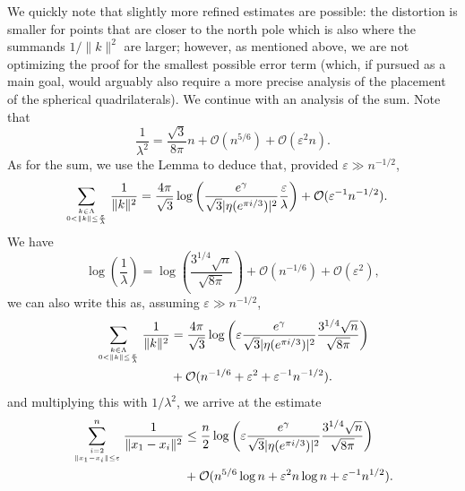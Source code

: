 \documentclass[10pt, reqno]{amsart}
\begin{document}
    We quickly note that slightly more refined estimates are possible: the distortion is smaller for points that are closer to the north pole which is also where the summands $1/\|k\|^2$ are larger; however, as mentioned above, we are not optimizing the proof for the smallest possible error term (which, if pursued as a main goal, would arguably also require a more precise analysis of the placement of the spherical quadrilaterals). We continue with an analysis of the sum. Note that
  $$ \frac{1}{\lambda^2} = \frac{\sqrt{3}}{8\pi} n + \mathcal{O}(n^{5/6}) + \mathcal{O}( \varepsilon^2 n ).$$
  As for the sum, we use the Lemma to deduce that, provided $\varepsilon \gg n^{-1/2}$,
  \begin{align*}
   \sum_{k \in \Lambda \atop 0 < \|  k\| \leq \frac{\varepsilon}{\lambda}} \frac{1}{\| k\|^2} &=  \frac{4\pi}{\sqrt{3}} \log\left( \frac{e^{\gamma}}{\sqrt{3} |\eta(e^{\pi i/3})|^2} \frac{\varepsilon}{\lambda} \right) + \mathcal{O}(\varepsilon^{-1} n^{-1/2}).
  \end{align*}
We have
  $$ \log \left( \frac{1}{\lambda}\right) =  \log \left( \frac{ 3^{1/4} \sqrt{n}}{ \sqrt{8 \pi}}\right) + \mathcal{O}(n^{-1/6}) + \mathcal{O}(\varepsilon^2),$$
  we can also write this as, assuming $\varepsilon \gg n^{-1/2}$,
    \begin{align*}
   \sum_{k \in \Lambda \atop 0 < \|  k\| \leq \frac{\varepsilon}{\lambda}} \frac{1}{\| k\|^2} &=  \frac{4\pi}{\sqrt{3}} \log\left(\varepsilon \frac{e^{\gamma}}{\sqrt{3} |\eta(e^{\pi i/3})|^2}  \frac{ 3^{1/4} \sqrt{n}}{ \sqrt{8 \pi}}\right) \\
   &+ \mathcal{O}(n^{-1/6} + \varepsilon^2 + \varepsilon^{-1} n^{-1/2}).
  \end{align*} 
  and multiplying this with $1/\lambda^2$, we arrive at the estimate
  \begin{align*}
  \sum_{i=2 \atop \|x_1 - x_i\| \leq \varepsilon}^{n} \frac{1}{\|x_1 - x_i\|^2} &\leq   \frac{n}{2} \log\left(\varepsilon \frac{e^{\gamma}}{\sqrt{3} |\eta(e^{\pi i/3})|^2}  \frac{ 3^{1/4} \sqrt{n}}{ \sqrt{8 \pi}}\right) \\
  &+ \mathcal{O}(n^{5/6} \log{n} +  \varepsilon^2 n \log{n} + \varepsilon^{-1} n^{1/2}).
  \end{align*}
 
\end{document}
